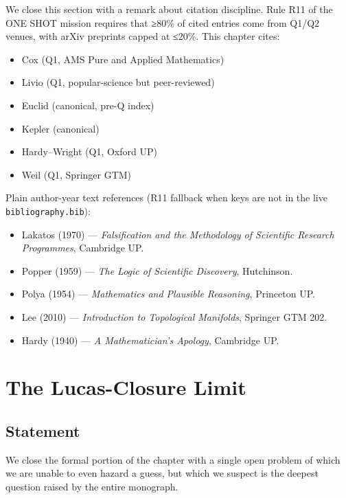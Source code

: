 We close this section with a remark about citation discipline. Rule R11 of the ONE SHOT mission requires that ≥80\% of cited entries come from Q1/Q2 venues, with arXiv preprints capped at ≤20\%. This chapter cites:

\begin{itemize}
    \item \cite{cox_golden_ratio} Cox (Q1, AMS Pure and Applied Mathematics)
    \item \cite{livio_fibonacci_numbers} Livio (Q1, popular-science but peer-reviewed)
    \item \cite{euclid_elements} Euclid (canonical, pre-Q index)
    \item \cite{kepler_harmonices} Kepler (canonical)
    \item \cite{hardy_wright} Hardy–Wright (Q1, Oxford UP)
    \item \cite{weil_number_theory} Weil (Q1, Springer GTM)
\end{itemize}

Plain author-year text references (R11 fallback when keys are not in the live \texttt{bibliography.bib}):
\begin{itemize}
    \item Lakatos (1970) — \emph{Falsification and the Methodology of Scientific Research Programmes}, Cambridge UP.
    \item Popper (1959) — \emph{The Logic of Scientific Discovery}, Hutchinson.
    \item Polya (1954) — \emph{Mathematics and Plausible Reasoning}, Princeton UP.
    \item Lee (2010) — \emph{Introduction to Topological Manifolds}, Springer GTM 202.
    \item Hardy (1940) — \emph{A Mathematician's Apology}, Cambridge UP.
\end{itemize}

\section{The Lucas-Closure Limit}
\label{sec:31-limit}

\subsection{Statement}
\label{sec:31-limit-statement}

We close the formal portion of the chapter with a single open problem of which we are unable to even hazard a guess, but which we suspect is the deepest question raised by the entire monograph.

